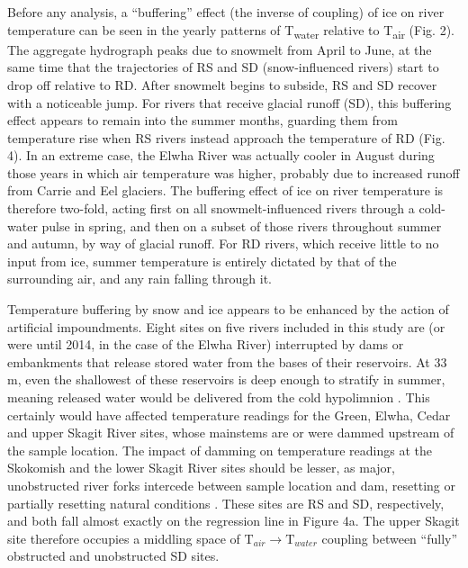 \documentclass[notitlepage]{article}
\begin{document}
Before any analysis, a ``buffering'' effect (the inverse of coupling) of ice on river temperature can be seen in the yearly patterns of T\textsubscript{water} relative to T\textsubscript{air} (Fig. 2). The aggregate hydrograph peaks due to snowmelt from April to June, at the same time that the trajectories of RS and SD (snow-influenced rivers) start to drop off relative to RD. After snowmelt begins to subside, RS and SD recover with a noticeable jump. For rivers that receive glacial runoff (SD), this buffering effect appears to remain into the summer months, guarding them from temperature rise when RS rivers instead approach the temperature of RD (Fig. 4). In an extreme case, the Elwha River was actually cooler in August during those years in which air temperature was higher, probably due to increased runoff from Carrie and Eel glaciers. The buffering effect of ice on river temperature is therefore two-fold, acting first on all snowmelt-influenced rivers through a cold-water pulse in spring, and then on a subset of those rivers throughout summer and autumn, by way of glacial runoff. For RD rivers, which receive little to no input from ice, summer temperature is entirely dictated by that of the surrounding air, and any rain falling through it.

Temperature buffering by snow and ice appears to be enhanced by the action of artificial impoundments. Eight sites on five rivers included in this study are (or were until 2014, in the case of the Elwha River) interrupted by dams or embankments that release stored water from the bases of their reservoirs. At 33 m, even the shallowest of these reservoirs is deep enough to stratify in summer, meaning released water would be delivered from the cold hypolimnion \citep{olden_hypoCold}. This certainly would have affected temperature readings for the Green, Elwha, Cedar and upper Skagit River sites, whose mainstems are or were dammed upstream of the sample location. The impact of damming on temperature readings at the Skokomish and the lower Skagit River sites should be lesser, as major, unobstructed river forks intercede between sample location and dam, resetting or partially resetting natural conditions \citep{ward1983serial}. These sites are RS and SD, respectively, and both fall almost exactly on the regression line in Figure 4a. The upper Skagit site therefore occupies a middling space of $\textrm{T}_{air}\rightarrow \textrm{T}_{water}$ coupling between ``fully'' obstructed and unobstructed SD sites.
\end{document}
